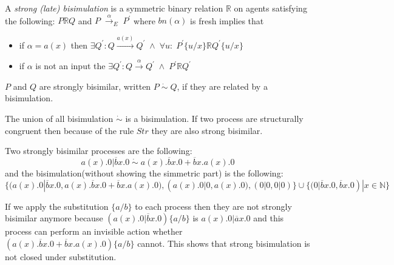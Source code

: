 \begin{definition}
  A \emph{strong (late) bisimulation} is a symmetric binary relation $\mathbb{R}$ on agents satisfying the following: $P\mathbb{R} Q$ and $P\; \xrightarrow{\alpha}_{E}\; P^{'}$ where $bn(\alpha)$ is fresh implies that
  \begin{itemize}
    \item
      if $\alpha=a(x)$ then $\exists Q^{'}: Q\xrightarrow{a(x)}Q^{'}\; \wedge\; \forall u:\; P^{'}\{u/x\}\mathbb{R}Q^{'}\{u/x\}$
    \item
      if $\alpha$ is not an input the $\exists Q^{'}: Q\xrightarrow{\alpha}Q^{'}\; \wedge\; P^{'}\mathbb{R}Q^{'}$
  \end{itemize}
  $P$ and $Q$ are strongly bisimilar, written $P\; \dot{\sim}\; Q$, if they are related by a bisimulation. 
\end{definition}

The union of all bisimulation $\dot{\sim}$ is a bisimulation. If two process are structurally congruent then because of the rule $Str$ they are also strong bisimilar.

\begin{example}
  Two strongly bisimilar processes are the following:
  \[
    a(x).0|\overline{b}x.0\; \dot{\sim}\; a(x).\overline{b}x.0 + \overline{b}x.a(x).0
  \]
  and the bisimulation(without showing the simmetric part) is  the following:
  \[
    \{(a(x).0|\overline{b}x.0, a(x).\overline{b}x.0 + \overline{b}x.a(x).0),(a(x).0|0,a(x).0), (0|0,0|0)\} \cup \{(0|\overline{b}x.0,\overline{b}x.0)|x\in \mathbb{N}\} 
  \]

  If we apply the substitution $\{a/b\}$ to each process then they are not strongly bisimilar anymore because $(a(x).0|\overline{b}x.0)\{a/b\}$ is $a(x).0|\overline{a}x.0$ and this process can perform an invisible action whether $(a(x).\overline{b}x.0 + \overline{b}x.a(x).0)\{a/b\}$ cannot. This shows that strong bisimulation is not closed under substitution.
\end{example}

